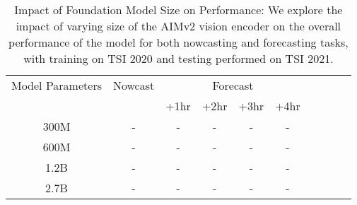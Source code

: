 \begin{table}[H]
  \caption{Impact of Foundation Model Size on Performance: We explore the impact of varying size of the AIMv2 vision encoder on the overall performance of the model for both nowcasting and forecasting tasks, with training on TSI 2020 and testing performed on TSI 2021.}
  \label{tab:encoder_sizes_ablation}
  \begin{tabular}{cccccc cccc}
    \toprule
    Model Parameters & \multicolumn{1}{c}{Nowcast} & \multicolumn{4}{c}{Forecast} \\
     \cmidrule(lr){3-6}
    & & +1hr & +2hr & +3hr & +4hr \\
    \midrule
    300M & - & - & - & - & - \\
    600M & - & - & - & - & - \\
    1.2B & - & - & - & - & - \\
    2.7B & - & - & - & - & - \\
    \bottomrule
  \end{tabular}
\end{table}
